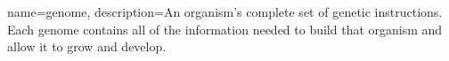  {
	name={genome}, 
	description={An organism’s complete set of genetic instructions. Each genome contains all of the information needed to build that organism and allow it to grow and develop.}
}



\glsaddall
